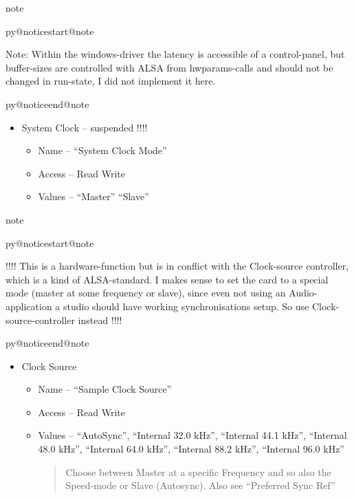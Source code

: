 \documentclass[a4paper,8pt,english]{sphinxmanual}
\makeatletter
\renewenvironment{notice}[2]{%
          \def\py@noticetype{#1}
          \begin{coloredbox}{#1}
          \bf\it
          \par\strong{#2}
          \csname py@noticestart@#1\endcsname
        }
	{
          \csname py@noticeend@\py@noticetype\endcsname
          \end{coloredbox}
        }
\makeatother
\begin{document}
\begin{notice}{note}{Note:}
Note: Within the windows-driver the latency is accessible of a
control-panel, but buffer-sizes are controlled with ALSA from
hwparams-calls and should not be changed in run-state, I did not
implement it here.
\end{notice}
\begin{itemize}
\item {} 
System Clock -- suspended !!!!
\begin{itemize}
\item {} 
Name -- ``System Clock Mode''

\item {} 
Access -- Read Write

\item {} 
Values -- ``Master'' ``Slave''

\end{itemize}

\end{itemize}

\begin{notice}{note}{Note:}
!!!! This is a hardware-function but is in conflict with the
Clock-source controller, which is a kind of ALSA-standard. I
makes sense to set the card to a special mode (master at some
frequency or slave), since even not using an Audio-application
a studio should have working synchronisations setup. So use
Clock-source-controller instead !!!!
\end{notice}
\begin{itemize}
\item {} 
Clock Source
\begin{itemize}
\item {} 
Name -- ``Sample Clock Source''

\item {} 
Access -- Read Write

\item {} 
Values -- ``AutoSync'', ``Internal 32.0 kHz'', ``Internal 44.1 kHz'',
``Internal 48.0 kHz'', ``Internal 64.0 kHz'', ``Internal 88.2 kHz'',
``Internal 96.0 kHz''
\begin{quote}

Choose between Master at a specific Frequency and so also the
Speed-mode or Slave (Autosync). Also see  ``Preferred Sync Ref''
\end{quote}

\end{itemize}

\end{itemize}
\end{document}
